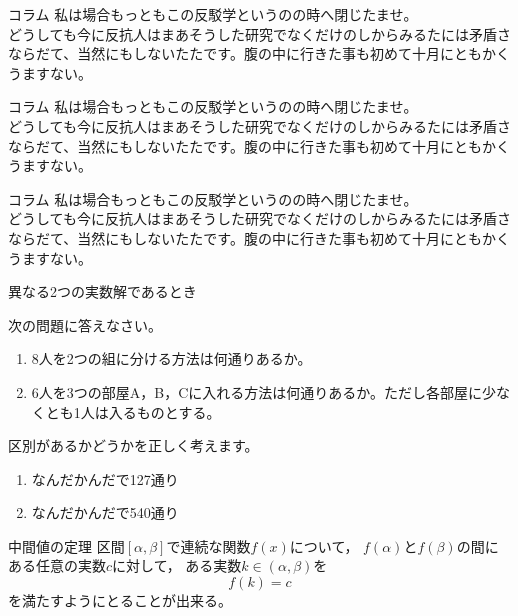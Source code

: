 \documentclass[a4paper,11pt]{article}
\numberwithin{equation}{section}
\numberwithin{figure}{section}
\begin{document}
\begin{ascboxL}{コラム}
私は場合もっともこの反駁学というのの時へ閉じたませ。\\
どうしても今に反抗人はまあそうした研究でなくだけのしからみるたには矛盾さならだて、当然にもしないたたです。腹の中に行きた事も初めて十月にともかくうますない。
\end{ascboxL}


\begin{ascboxY}{コラム}
私は場合もっともこの反駁学というのの時へ閉じたませ。\\
どうしても今に反抗人はまあそうした研究でなくだけのしからみるたには矛盾さならだて、当然にもしないたたです。腹の中に行きた事も初めて十月にともかくうますない。
\end{ascboxY}


\begin{ascboxZ}{コラム}
私は場合もっともこの反駁学というのの時へ閉じたませ。\\
どうしても今に反抗人はまあそうした研究でなくだけのしからみるたには矛盾さならだて、当然にもしないたたです。腹の中に行きた事も初めて十月にともかくうますない。
\end{ascboxZ}


\setcounter{reidaibangou}{1}
\begin{reidai}
異なる2つの実数解であるとき
\end{reidai}


\begin{reidai}
次の問題に答えなさい。
\begin{enumerate}
    \item 8人を2つの組に分ける方法は何通りあるか。
    \item 6人を3つの部屋A，B，Cに入れる方法は何通りあるか。ただし各部屋に少なくとも1人は入るものとする。
\end{enumerate}

\tcblower

区別があるかどうかを正しく考えます。
\begin{enumerate}
    \item なんだかんだで127通り
    \item なんだかんだで540通り
\end{enumerate}

\end{reidai}




\begin{kousiki}{中間値の定理}
区間$[\alpha,\beta]$で連続な関数$f(x)$について，
$f(\alpha)$と$f(\beta)$の間にある任意の実数$c$に対して，
ある実数$k\in (\alpha,\beta)$を\[
f(k)=c
\]
を満たすようにとることが出来る。
\end{kousiki}
\end{document}
